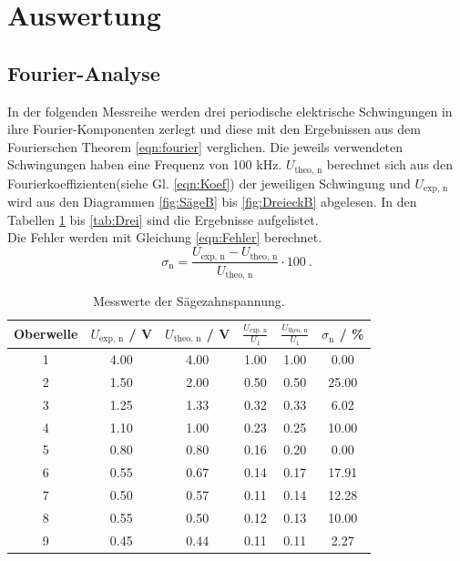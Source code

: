 \section{Auswertung}
\label{sec:Auswertung}

\subsection{Fourier-Analyse}
\label{sec:Analyse}
In der folgenden Messreihe werden drei periodische elektrische Schwingungen in ihre Fourier-Komponenten zerlegt und diese mit den Ergebnissen aus dem Fourierschen Theorem \ref{eqn:fourier} verglichen. Die jeweils verwendeten Schwingungen haben eine Frequenz von 100 kHz. $U_\text{theo, n}$ berechnet sich aus den Fourierkoeffizienten(siehe Gl. \ref{eqn:Koef}) der jeweiligen Schwingung und $U_\text{exp, n}$ wird aus den Diagrammen \ref{fig:SägeB} bis \ref{fig:DreieckB} abgelesen. In den Tabellen \ref{tab:Säge} bis \ref{tab:Drei} sind die Ergebnisse aufgelistet. \\
Die Fehler werden mit Gleichung \ref{eqn:Fehler} berechnet.
\begin{equation}
  \sigma_\text{n} = \frac{U_\text{exp, n} - U_\text{theo, n}}{U_\text{theo, n}} \cdot 100 \ .
  \label{eqn:Fehler}
\end{equation}

\begin{table}[H] %
  \centering
  \begin{tabular}{c | c | c | c | c | c}
    \toprule
    Oberwelle & $U_\text{exp, n}$ / V & $U_\text{theo, n}$ / V & $\frac{U_\text{exp, n}}{U_1}$ & $\frac{U_\text{theo, n}}{U_1}$ & $\sigma_\text{n}$ / \% \\
    \midrule
    1  & 4.00 & 4.00 & 1.00 & 1.00 & 0.00  \\
    2  & 1.50 & 2.00 & 0.50 & 0.50 & 25.00 \\
    3  & 1.25 & 1.33 & 0.32 & 0.33 & 6.02  \\
    4  & 1.10 & 1.00 & 0.23 & 0.25 & 10.00 \\
    5  & 0.80 & 0.80 & 0.16 & 0.20 & 0.00  \\
    6  & 0.55 & 0.67 & 0.14 & 0.17 & 17.91 \\
    7  & 0.50 & 0.57 & 0.11 & 0.14 & 12.28 \\
    8  & 0.55 & 0.50 & 0.12 & 0.13 & 10.00 \\
    9  & 0.45 & 0.44 & 0.11 & 0.11 & 2.27  \\
    \bottomrule
  \end{tabular}
  \caption{Messwerte der Sägezahnspannung.}
  \label{tab:Säge}
\end{table}

